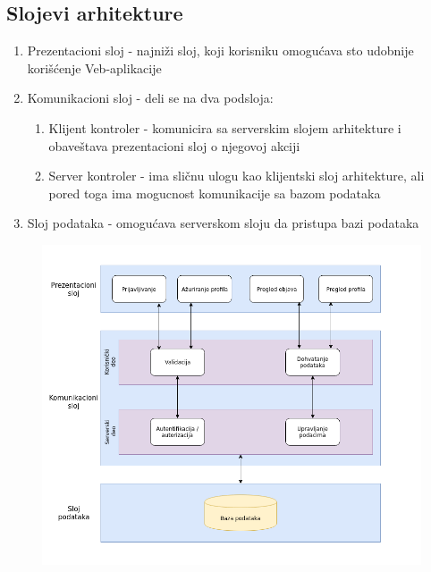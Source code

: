\subsection{Slojevi arhitekture}
\begin{enumerate}
    \item Prezentacioni sloj - najniži sloj, koji korisniku omogućava sto udobnije korišćenje Veb-aplikacije
    \item Komunikacioni sloj - deli se na dva podsloja:
    \begin{enumerate}
	    \item Klijent kontroler - komunicira sa serverskim slojem arhitekture i obaveštava prezentacioni sloj o njegovoj akciji
	    \item Server kontroler - ima sličnu ulogu kao klijentski sloj arhitekture, ali pored toga ima mogucnost komunikacije sa bazom podataka
	\end{enumerate}
    \item Sloj podataka - omogućava serverskom sloju da pristupa bazi podataka
\end{enumerate}
\begin{figure}[h!]
		\centerline{\includegraphics[scale=0.7]{slike/arhitektura.png}}
\end{figure}
